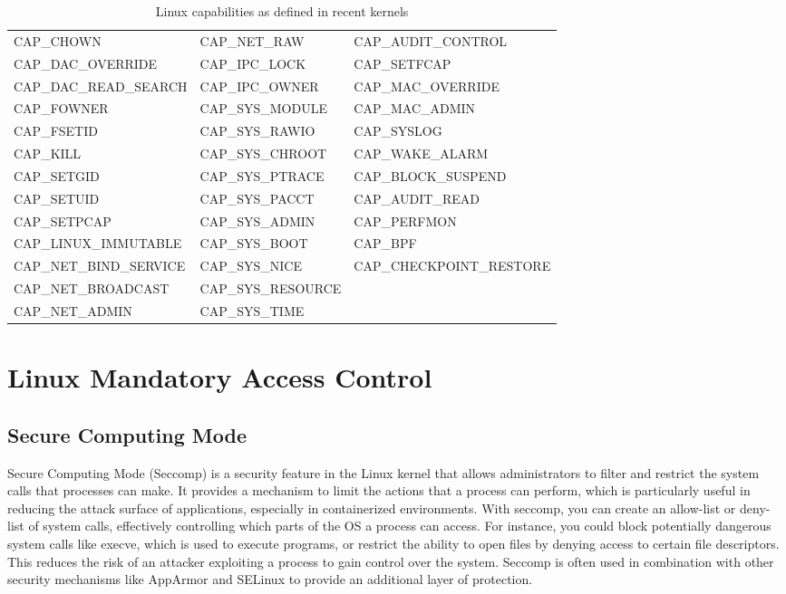 \documentclass[12pt]{report}
\begin{document}
\begin{doublespace}
\begin{table}[H]
  \centering
  \caption{Linux capabilities as defined in recent kernels \cite{kerrisk2025capabilities}}
  \label{table:linux-capabilities}
  \footnotesize
  \begin{tabular}{|l|l|l|}
    \hline
    CAP_CHOWN & CAP_NET_RAW & CAP_AUDIT_CONTROL \\
    CAP_DAC_OVERRIDE & CAP_IPC_LOCK & CAP_SETFCAP \\
    CAP_DAC_READ_SEARCH & CAP_IPC_OWNER & CAP_MAC_OVERRIDE \\
    CAP_FOWNER & CAP_SYS_MODULE & CAP_MAC_ADMIN \\
    CAP_FSETID & CAP_SYS_RAWIO & CAP_SYSLOG \\
    CAP_KILL & CAP_SYS_CHROOT & CAP_WAKE_ALARM \\
    CAP_SETGID & CAP_SYS_PTRACE & CAP_BLOCK_SUSPEND \\
    CAP_SETUID & CAP_SYS_PACCT & CAP_AUDIT_READ \\
    CAP_SETPCAP & CAP_SYS_ADMIN & CAP_PERFMON \\
    CAP_LINUX_IMMUTABLE & CAP_SYS_BOOT & CAP_BPF \\
    CAP_NET_BIND_SERVICE & CAP_SYS_NICE & CAP_CHECKPOINT_RESTORE \\
    CAP_NET_BROADCAST & CAP_SYS_RESOURCE & \\
    CAP_NET_ADMIN & CAP_SYS_TIME & \\
    \hline
  \end{tabular}
\end{table}


\section{Linux Mandatory Access Control}

\subsection{Secure Computing Mode}
Secure Computing Mode (Seccomp) is a security feature in the Linux kernel that allows administrators to filter and restrict the system calls that processes can make. It provides a mechanism to limit the actions that a process can perform, which is particularly useful in reducing the attack surface of applications, especially in containerized environments. With seccomp, you can create an allow-list or deny-list of system calls, effectively controlling which parts of the OS a process can access. For instance, you could block potentially dangerous system calls like execve, which is used to execute programs, or restrict the ability to open files by denying access to certain file descriptors. This reduces the risk of an attacker exploiting a process to gain control over the system. Seccomp is often used in combination with other security mechanisms like AppArmor and SELinux to provide an additional layer of protection.


\end{doublespace}
\end{document}
